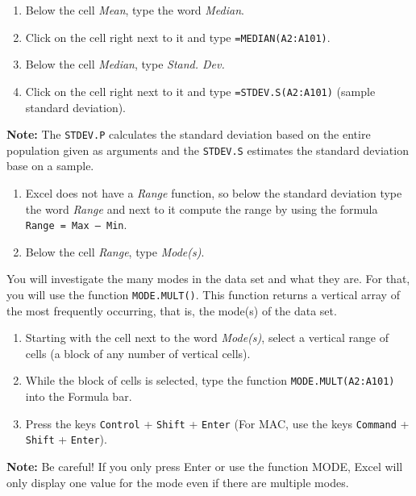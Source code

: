 \documentclass[
  12pt,
  letterpaper,
]{book}
\providecommand{\tightlist}{%
  \setlength{\itemsep}{0pt}\setlength{\parskip}{0pt}}
\begin{document}
\begin{enumerate}
\def\labelenumi{\arabic{enumi}.}
\setcounter{enumi}{2}
\tightlist
\item
  Below the cell \emph{Mean}, type the word \emph{Median}.
\item
  Click on the cell right next to it and type \texttt{=MEDIAN(A2:A101)}.
\item
  Below the cell \emph{Median}, type \emph{Stand. Dev.}
\item
  Click on the cell right next to it and type \texttt{=STDEV.S(A2:A101)} (sample standard deviation).
\end{enumerate}

\textbf{Note:} The \texttt{STDEV.P} calculates the standard deviation based on the entire population given as arguments and the \texttt{STDEV.S} estimates the standard deviation base on a sample.

\begin{enumerate}
\def\labelenumi{\arabic{enumi}.}
\setcounter{enumi}{6}
\tightlist
\item
  Excel does not have a \emph{Range} function, so below the standard deviation type the word \emph{Range} and next to it compute the range by using the formula \texttt{Range\ =\ Max\ –\ Min}.
\item
  Below the cell \emph{Range}, type \emph{Mode(s)}.
\end{enumerate}

You will investigate the many modes in the data set and what they are. For that, you will use the function \texttt{MODE.MULT()}. This function returns a vertical array of the most frequently occurring, that is, the mode(s) of the data set.

\begin{enumerate}
\def\labelenumi{\arabic{enumi}.}
\setcounter{enumi}{8}
\tightlist
\item
  Starting with the cell next to the word \emph{Mode(s)}, select a vertical range of cells (a block of any number of vertical cells).
\item
  While the block of cells is selected, type the function \texttt{MODE.MULT(A2:A101)} into the Formula bar.
\item
  Press the keys \texttt{Control} + \texttt{Shift} + \texttt{Enter} (For MAC, use the keys \texttt{Command} + \texttt{Shift} + \texttt{Enter}).
\end{enumerate}

\textbf{Note:} Be careful! If you only press Enter or use the function MODE, Excel will only display one value for the mode even if there are multiple modes.
\end{document}
